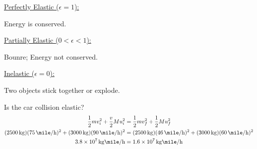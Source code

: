 \documentclass{article}
\begin{document}
\underline{Perfectly Elastic ($ \epsilon = 1 $):}

Energy is conserved.

\underline{Partially Elastic ($ 0 < \epsilon <  1 $):}

Bounre; Energy not conserved.

\underline{Inelastic ($ \epsilon = 0 $):}

Two objects stick together or explode.

\hr

Is the car collision elastic?
\begin{align*}
	\frac{1}{2}mv_i^2 + \frac{v}{2}Mu_i^2 & = \frac{1}{2}mv_f^2 + \frac{1}{2}Mu_f^2 \\
	(\SI{2500}{\kilogram})(\SI{75}{\mile \per \hour})^2 + (\SI{3000}{\kilogram})(\SI{90}{\mile \per \hour})^2 & = (\SI{2500}{\kilogram})(\SI{46}{\mile \per \hour})^2 + (\SI{3000}{\kilogram})(\SI{60}{\mile \per \hour})^2 \\
	\SI{3.8e7}{\kilogram \mile \per \hour} & = \SI{1.6e7}{\kilogram \mile \per \hour}
\end{align*}
\end{document}
